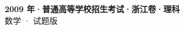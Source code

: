 \documentclass[zihao=-4, a4paper]{ctexart}
\begin{document}
\begin{center}
  {\Large\bfseries 2009 年·普通高等学校招生考试·浙江卷·理科}\\[4pt]
  {\large 数学 · 试题版}
\end{center}
\medskip
{}

\end{document}
